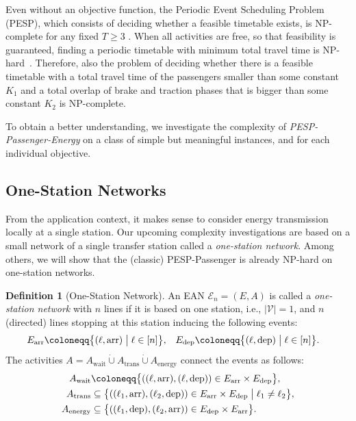 \documentclass[11pt,a4paper]{article}
\newcommand{\dotcup}{\mathbin{\dot\cup}}
\newcommand{\arr}{\mathrm{arr}}
\newcommand{\dep}{\mathrm{dep}}
\newcommand{\wait}{\mathrm{wait}}
\newcommand{\transfer}{\mathrm{trans}}
\newcommand{\energy}{\mathrm{energy}}
\newcommand{\possenergyact}{A_{\energy}} %
\newcommand{\pesp}{PESP\xspace}
\newcommand{\pesppassenger}{PESP-Passenger\xspace}
\newcommand{\pesppassenergy}{PESP-Passenger-Energy\xspace}
\newcommand{\osn}{one-station network\xspace}
\newcommand{\cE}{\mathcal{E}}
\theoremstyle{definition}
\newtheorem{definition}[theorem]{Definition}
\theoremstyle{remark}
\begin{document}
Even without an objective function, the Periodic Event Scheduling Problem (\pesp), which consists of deciding whether a feasible timetable exists, is NP-complete for any fixed $T\geq 3$ \cite{odijk1994}. When all activities are free, so that feasibility is guaranteed, finding a periodic timetable with minimum total travel time is NP-hard~\cite{Nachtigall1993,LindnerReisch22}.
Therefore, also the problem of deciding whether there is a feasible timetable with a total travel time of the passengers smaller than some constant $K_1$ and a total overlap of brake and traction phases that is bigger than some constant $K_2$ is NP-complete.

To obtain a better understanding, we investigate the complexity of \emph{\pesppassenergy} on a class of simple but meaningful instances, and for each individual objective.

\subsection{One-Station Networks}

From the application context, it makes sense to consider energy transmission locally at a single station.
Our upcoming complexity investigations are based on a small network of a single transfer station called a \emph{\osn}. Among others, we will show that the (classic) \pesppassenger is already NP-hard on one-station networks.


\begin{definition}[One-Station Network]\label{osnetwork}
	An EAN $\cE_n =(E, A)$ is called a \emph{\osn} with $n$ lines if it is based on one station, i.e., $|\mathcal{V}| = 1$, and $n$ (directed) lines stopping at this station inducing the following events:
	\begin{align*}
		E_{\arr} &\coloneqq \bigl\{ ( \ell, \arr) \bigm| \ell \in [n] \bigr\}, 
		& E_{\dep} &\coloneqq \bigl\{ (\ell, \dep) \bigm|  \ell \in [n] \bigr\}.
	\end{align*}
	The activities $A =  A_\wait \dotcup A_\transfer \dotcup \possenergyact$ connect the events as follows:	
	\begin{align*}
		A_\wait  &\coloneqq \bigl\{ (( \ell, \arr), ( \ell, \dep)) \in E_\arr \times E_\dep \bigr\}, \\
		A_\transfer &\subseteq \bigl\{ ((\ell_1, \arr), (\ell_2 , \dep)) \in E_\arr \times E_\dep \bigm| \ell_1 \neq \ell_2 \bigr\}, \\
		A_{\energy}  &\subseteq \bigl\{ ((\ell_1, \dep), (\ell_2, \arr)) \in E_{\dep} \times E_{\arr} \bigr\}
		.
	\end{align*}
\end{definition}
\end{document}
